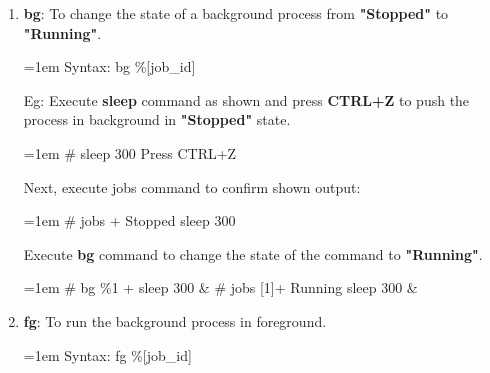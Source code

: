 \begin{flushleft}
\begin{enumerate}
\begin{itemize}
\begin{enumerate}
			\bigskip
			
			\item \textbf{bg}: To change the state of a background process from \textbf{"Stopped"} to \textbf{"Running"}.
			\begin{tcolorbox}[breakable,notitle,boxrule=-0pt,colback=pink,colframe=pink]
				\color{black}
				\font=1em
				Syntax: bg \%[job\_id]
				\font=4pt
			\end{tcolorbox}
			
			Eg: Execute \textbf{sleep} command as shown and press \textbf{CTRL+Z} to push the process in background in \textbf{"Stopped"} state.
			\begin{tcolorbox}[breakable,notitle,boxrule=-0pt,colback=black,colframe=black]
				\color{green}
				\font=1em
				\# sleep 300 
				\color{yellow}
				\newline
				Press CTRL+Z
				\font=4pt
			\end{tcolorbox}
			Next, execute jobs command to confirm shown output:
			\begin{tcolorbox}[breakable,notitle,boxrule=-0pt,colback=black,colframe=black]
				\color{green}
				\font=1em
				\# jobs 
				\color{white}
				\newline
				[1]+  Stopped                 sleep 300
				\font=4pt
			\end{tcolorbox}
			Execute \textbf{bg} command to change the state of the command to \textbf{"Running"}.
			\begin{tcolorbox}[breakable,notitle,boxrule=-0pt,colback=black,colframe=black]
				\color{green}
				\font=1em
				\# bg \%1
				\color{white}
				\newline
				[1]+ sleep 300 \&
				\newline
				\color{green}
				\# jobs
				\color{white}
				\newline
				\color{white}
				[1]+  Running             sleep 300 \&
				\font=4pt
			\end{tcolorbox}
			
			\bigskip
			\bigskip
			
				\item \textbf{fg}: To run the background process in foreground.
			\begin{tcolorbox}[breakable,notitle,boxrule=-0pt,colback=pink,colframe=pink]
				\color{black}
				\font=1em
				Syntax: fg \%[job\_id]
				\font=4pt
			\end{tcolorbox}
			

\end{enumerate}
\end{itemize}
\end{enumerate}
\end{flushleft}
